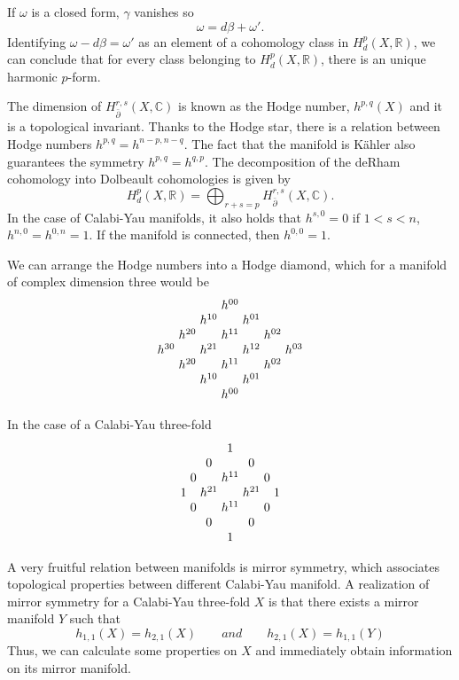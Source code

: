 If $\omega$ is a closed form, $\gamma$ vanishes so
\begin{equation}
  \omega = d\beta + \omega'.
\end{equation}
Identifying $\omega - d\beta= \omega'$ as an element of a cohomology class in $H_d^p(X,\mathbb R)$,
we can conclude that for every class belonging to $H_d^p(X,\mathbb R)$, there is an unique
harmonic $p$-form.

The dimension of $H^{r,s}_{\bar \partial }(X,\mathbb C)$ is known as the Hodge number, $h^{p,q}(X)$ and it is a topological invariant.
Thanks to the Hodge star, there is a relation between Hodge numbers $h^{p,q}=h^{n-p,n-q}$.
The fact that the manifold is Kähler also guarantees the symmetry $h^{p,q}=h^{q,p}$.
The decomposition of the deRham cohomology into Dolbeault cohomologies is given by
\begin{equation}
  H_d^p(X,\mathbb R)=\bigoplus_{r+s=p} H_{\bar \partial}^{r,s}(X,\mathbb C).
\end{equation}
In the case of Calabi-Yau manifolds, it also holds that $h^{s,0}=0$ if $1<s<n$, $h^{n,0}=h^{0,n}=1$.
If the manifold is connected, then $h^{0,0}=1$.

We can arrange the Hodge numbers into a Hodge diamond, which for a manifold of complex dimension
three would be
{\small \[
\arraycolsep=1.5pt
\begin{array}{ccccccc}
  &&&h^{00}&&&\\
 &&h^{10}&&h^{01}&&\\
 &h^{20}&&h^{11}&&h^{02}&\\
 h^{30}&&h^{21}&&h^{12}&&h^{03}\\
 &h^{20}&&h^{11}&&h^{02}&\\
 &&h^{10}&&h^{01}&&\\
  &&&h^{00}&&&
\end{array}
\]}

In the case of a Calabi-Yau three-fold
{\small \[
\arraycolsep=1.5pt
\begin{array}{ccccccc}
  &&&1&&&\\
 &&0&&0&&\\
 &0&&h^{11}&&0&\\
 1&&h^{21}&&h^{21}&&1\\
 &0&&h^{11}&&0&\\
 &&0&&0&&\\
  &&&1&&&
\end{array}
\]}

A very fruitful relation between manifolds is mirror symmetry, which associates topological
properties between different Calabi-Yau manifold.
A realization of mirror symmetry for a Calabi-Yau three-fold $X$ is that there exists a mirror manifold $Y$
such that
\begin{equation}
  h_{1,1}(X)=h_{2,1}(X) \qquad and \qquad h_{2,1}(X)=h_{1,1}(Y)
\end{equation}
Thus, we can calculate some properties on $X$ and immediately obtain information on its mirror manifold.

